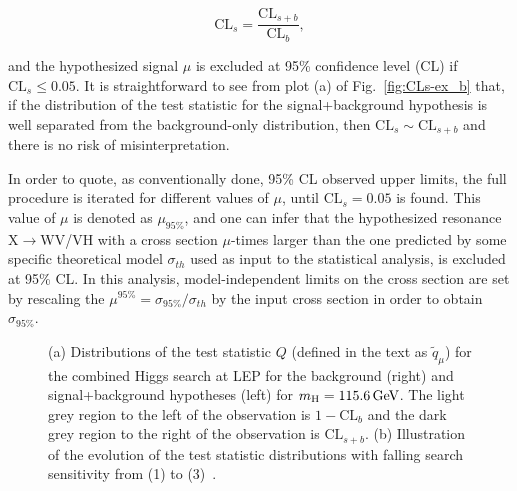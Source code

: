 \begin{equation}
\mathrm{CL}_s = \frac{\mathrm{CL}_{s+b}}{\mathrm{CL}_b},
\end{equation}

and the hypothesized signal $\mu$ is excluded at 95\% confidence level (CL) if $\mathrm{CL}_s \leq 0.05$.
It is straightforward to see from plot (a) of Fig.~\ref{fig:CLs-ex_b} that, if the distribution of the test statistic for the signal+background hypothesis
is well separated from the background-only distribution, then $\mathrm{CL}_s \sim \mathrm{CL}_{s+b}$ and there is no risk of misinterpretation.

In order to quote, as conventionally done, 95\% CL observed upper limits, the full procedure is iterated for different values of $\mu$, until $\mathrm{CL}_s = 0.05$ is found.
This value of $\mu$ is denoted as $\mu_{95\%}$, and one can infer that the hypothesized resonance X$\rightarrow$WV/VH with a cross section $\mu$-times larger than the one predicted 
by some specific theoretical model $\sigma_{th}$ used as input to the statistical analysis, is excluded at 95\% CL.
In this analysis, model-independent limits on the cross section are set by rescaling the $\mu^{95\%} = \sigma_{95\%}/\sigma_{th}$ by the input cross section in order to obtain $\sigma_{95\%}$.

\begin{figure}[!htb]
\centering
{}
\caption{(a) Distributions of the test statistic $Q$ (defined in the text as $\tilde{q}_\mu$) for the combined Higgs search at LEP for the background (right) and signal+background hypotheses (left) for $m_\mathrm{H} = 115.6\,\text{Ge\hspace{-.08em}V}$.
The light grey region to the left of the observation is $1-\mathrm{CL}_b$ and the dark grey region to the right of the observation is $\mathrm{CL}_{s+b}$. (b) Illustration of the evolution of the test statistic distributions with falling search sensitivity from (1) to (3)~\cite{CLs1}.}
\label{fig:CLs-ex}
\end{figure}

